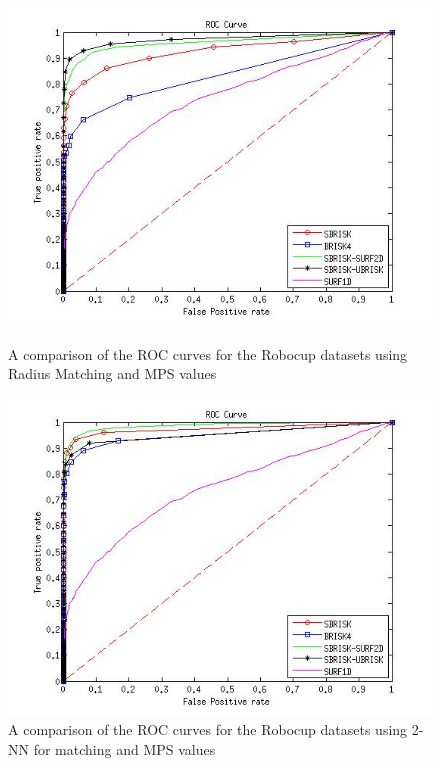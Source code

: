 \documentclass[11pt]{report}
\begin{document}
\begin{figure}[h!]
\begin{minipage}[b]{0.5\linewidth}
\includegraphics[scale=0.4]{../Drawings/RobocupDataset/ROC_General_Hamming_max.jpg}
\caption{A comparison of the ROC curves for the Robocup datasets using Radius Matching and MPS values}
\label{fig:compareHamming}
\end{minipage}
\hspace{0.5cm}
\begin{minipage}[b]{0.5\linewidth}
\includegraphics[scale=0.4]{../Drawings/RobocupDataset/ROC_General_KNN_max.jpg}
\caption{A comparison of the ROC curves for the Robocup datasets using 2-NN for matching and MPS values}
\label{fig:compareKNN}
\end{minipage}
\end{figure}
\end{document}
